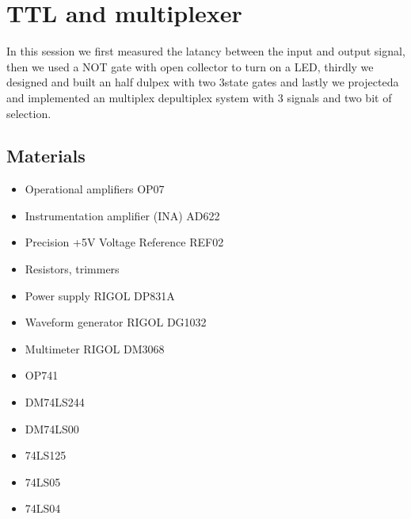 \chapter{TTL and multiplexer}
In this session we first measured the latancy between the input and output signal, then we used a NOT gate with open collector to turn on a LED, thirdly we designed and built an half dulpex with two 3state gates and lastly we projecteda and implemented an multiplex depultiplex system with 3 signals and two bit of selection.

\section{Materials}
\begin{itemize}
\item Operational amplifiers OP07
\item Instrumentation amplifier (INA) AD622
\item Precision +5V Voltage Reference REF02
\item Resistors, trimmers
\item Power supply RIGOL DP831A
\item Waveform generator RIGOL DG1032
\item Multimeter RIGOL DM3068
\item OP741
\item DM74LS244
\item DM74LS00
\item 74LS125
\item 74LS05
\item 74LS04
\end{itemize}
